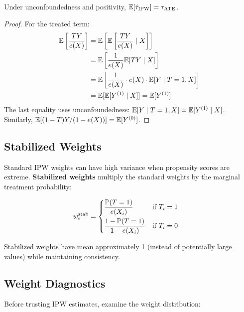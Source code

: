 \begin{theorem}
\label{thm:ipw_unbiased}
Under unconfoundedness and positivity, $\mathbb{E}[\hat{\tau}_{\text{IPW}}] = \tau_{\text{ATE}}$.
\end{theorem}

\begin{proof}
For the treated term:
\begin{align}
\mathbb{E}\left[\frac{T Y}{e(X)}\right] &= \mathbb{E}\left[\mathbb{E}\left[\frac{T Y}{e(X)} \mid X\right]\right] \\
&= \mathbb{E}\left[\frac{1}{e(X)} \mathbb{E}[T Y \mid X]\right] \\
&= \mathbb{E}\left[\frac{1}{e(X)} \cdot e(X) \cdot \mathbb{E}[Y \mid T=1, X]\right] \\
&= \mathbb{E}[\mathbb{E}[Y^{(1)} \mid X]] = \mathbb{E}[Y^{(1)}]
\end{align}
The last equality uses unconfoundedness: $\mathbb{E}[Y \mid T=1, X] = \mathbb{E}[Y^{(1)} \mid X]$.
Similarly, $\mathbb{E}[(1-T)Y/(1-e(X))] = \mathbb{E}[Y^{(0)}]$.
\end{proof}

\subsection{Stabilized Weights}

Standard IPW weights can have high variance when propensity scores are extreme. \textbf{Stabilized weights} multiply the standard weights by the marginal treatment probability:

\begin{definition}
\begin{align}
w_i^{\text{stab}} &= \begin{cases}
\displaystyle\frac{\mathbb{P}(T=1)}{e(X_i)} & \text{if } T_i = 1 \\[2ex]
\displaystyle\frac{1 - \mathbb{P}(T=1)}{1 - e(X_i)} & \text{if } T_i = 0
\end{cases}
\end{align}
\end{definition}

Stabilized weights have mean approximately 1 (instead of potentially large values) while maintaining consistency.

\subsection{Weight Diagnostics}

Before trusting IPW estimates, examine the weight distribution:

